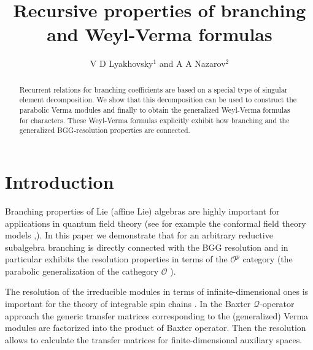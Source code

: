 \documentclass[12pt]{article}
\theoremstyle{definition}
\begin{document}
\title{Recursive properties of branching and Weyl-Verma formulas}
\author{V D Lyakhovsky$^1$ and A A Nazarov$^2$}

\maketitle

\begin{abstract}
Recurrent relations for branching coefficients are based on a special type of
singular element decomposition. We show that this decomposition can be used to
construct the parabolic Verma modules and finally to obtain the generalized
Weyl-Verma formulas for characters.
These Weyl-Verma formulas explicitly exhibit how branching and the generalized
BGG-resolution properties are connected.
\end{abstract}



\section{Introduction}

\label{sec:introduction}

Branching properties of Lie (affine Lie) algebras are highly important for
applications in quantum field theory (see for example the conformal field
theory models \cite{difrancesco1997cft},\cite{coquereaux2008conformal}). In
this paper we demonstrate that for an arbitrary reductive subalgebra
branching is directly connected with the BGG resolution and in particular
exhibits the resolution properties in terms of the $\mathcal{O}^{p}$
category \cite{lepowsky1977generalization} (the parabolic generalization of
the cathegory $\mathcal{O}$ \cite{bernstein1976category}).

The resolution of the irreducible modules in terms of infinite-dimensional ones is important for the
theory of integrable spin chains \cite{derk1008}. In the Baxter $\mathcal{Q}$-operator approach the generic transfer
matrices corresponding to the (generalized) Verma modules are factorized into the product of Baxter
operator. Then the resolution allows to calculate the transfer matrices for finite-dimensional
auxiliary spaces. 
\end{document}
